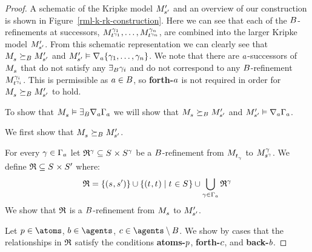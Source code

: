 \begin{proof}
A schematic of the Kripke model $\kPModelP{\kStateSP}$ and an overview of our construction is shown in Figure~\ref{rml-k-rk-construction}.
Here we can see that each of the $\agentsB$-refinements at successors, $\kPModel[\gamma_1]{\kStateT[\gamma_1]}, \dots, \kPModel[\gamma_n]{\kStateT[\gamma_n]}$, are combined into the larger Kripke model $\kPModelP{\kStateSP}$.
From this schematic representation we can clearly see that $\kPModel{\kStateS} \simulatesBs \kPModelP{\kStateSP}$ and $\kPModelP{\kStateSP} \entails \coversA \{\gamma_1, \dots, \gamma_n\}$.
We note that there are $\agentA$-successors of $\kPModel{\kStateS}$ that do not satisfy any $\somerefsBs \gamma_i$ and do not correspond to any $\agentsB$-refinement $\kPModel[\gamma_i]{\kStateT[\gamma_i]}$.
This is permissible as $\agentA \in \agentsB$, so {\bf forth-$\agentA$} is not required in order for $\kPModel{\kStateS} \simulatesBs \kPModelP{\kStateSP}$ to hold.

To show that $\kPModel{\kStateS} \entails \somerefsBs \coversA \Gamma_\agentA$ we will show that $\kPModel{\kStateS} \simulatesBs \kPModelP{\kStateSP}$ and $\kPModelP{\kStateSP} \entails \coversA \Gamma_\agentA$.

We first show that $\kPModel{\kStateS} \simulatesBs \kPModelP{\kStateSP}$.

For every $\gamma \in \Gamma_\agentA$ let $\refinement^\gamma \subseteq \kStates \times \kStates[\gamma]$ be a $\agentsB$-refinement from $\kPModel{\kStateT_\gamma}$ to $\kPModel[\gamma]{\kStateS[\gamma]}$.
We define $\refinement \subseteq \kStates \times \kStatesP$ where:
$$
\refinement = \{(\kStateS, \kStateSP)\} \cup \{(\kStateT, \kStateT) \mid \kStateT \in \kStates\} \cup \bigcup_{\gamma \in \Gamma_\agentA} \refinement^\gamma
$$
We show that $\refinement$ is a $\agentsB$-refinement from $\kPModel{\kStateS}$ to $\kPModelP{\kStateSP}$.

Let $\atomP \in \atoms$, $\agentB \in \agents$, $\agentC \in \agents \setminus \agentsB$.
We show by cases that the relationships in $\refinement$ satisfy the conditions {\bf atoms-$\atomP$}, {\bf forth-$\agentC$}, and {\bf back-$\agentB$}.


\end{proof}
